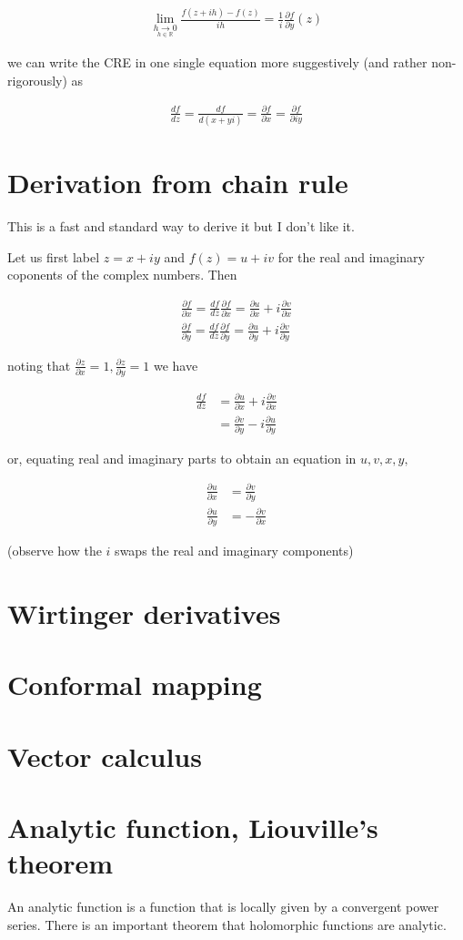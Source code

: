 \documentclass{article}
\begin{document}
\begin{align}
\lim_{\underset{h\in \mathbb{R}}{h\to 0}} \frac{f(z+ih)-f(z)}{ih} =\frac{1}{i}\frac{\partial f}{\partial y}(z)
\end{align}

we can write the CRE in one single equation more suggestively (and rather non-rigorously) as

\begin{align}
\frac{d f}{d z} = \frac{d f}{d (x+yi)} = \frac{\partial f}{\partial x}=\frac{\partial f}{\partial iy}
\end{align}

\section{Derivation from chain rule}

This is a fast and standard way to derive it but I don't like it.

Let us first label $z=x+iy$ and $f(z) = u+iv$ for the real and imaginary coponents of the complex numbers. Then

\begin{align}
\frac{\partial f}{\partial x} = \frac{df}{dz}\frac{\partial f}{\partial x} = \frac{\partial u}{\partial x} + i\frac{\partial v}{\partial x} \\
\frac{\partial f}{\partial y} = \frac{df}{dz}\frac{\partial f}{\partial y} = \frac{\partial u}{\partial y} + i\frac{\partial v}{\partial y} 
\end{align}

noting that $\frac{\partial z}{\partial x} = 1, \frac{\partial z}{\partial y} = 1$ we have

\begin{align}
\frac{df}{dz} &= \frac{\partial u}{\partial x} + i\frac{\partial v}{\partial x}\\
              &= \frac{\partial v}{\partial y} - i\frac{\partial u}{\partial y}
\end{align}

or, equating real and imaginary parts to obtain an equation in $u,v,x,y,$

\begin{align}
\frac{\partial u}{\partial x} &= \frac{\partial v}{\partial y} \\
\frac{\partial u}{\partial y} &=-\frac{\partial v}{\partial x}
\end{align}

(observe how the $i$ swaps the real and imaginary components)

\section{Wirtinger derivatives}
\section{Conformal mapping}
\section{Vector calculus}
\section{Analytic function, Liouville's theorem}

An analytic function is a function that is locally given by a convergent power series. There is an important theorem that holomorphic functions are analytic.
\end{document}
